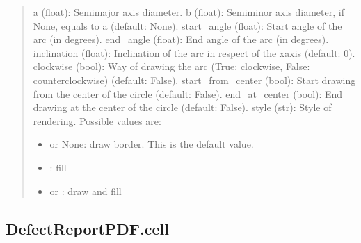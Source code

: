 \documentclass[letterpaper,10pt,english]{sphinxmanual}
\begin{document}
\begin{fulllineitems}
\begin{fulllineitems}
\begin{quote}
\sphinxAtStartPar
a (float): Semi\sphinxhyphen{}major axis diameter.
b (float): Semi\sphinxhyphen{}minor axis diameter, if None, equals to a (default: None).
start\_angle (float): Start angle of the arc (in degrees).
end\_angle (float): End angle of the arc (in degrees).
inclination (float): Inclination of the arc in respect of the x\sphinxhyphen{}axis (default: 0).
clockwise (bool): Way of drawing the arc (True: clockwise, False: counterclockwise) (default: False).
start\_from\_center (bool): Start drawing from the center of the circle (default: False).
end\_at\_center (bool): End drawing at the center of the circle (default: False).
style (str): Style of rendering. Possible values are:
\begin{itemize}
\item {} 
\sphinxAtStartPar
{} or None: draw border. This is the default value.

\item {} 
\sphinxAtStartPar
{}: fill

\item {} 
\sphinxAtStartPar
{} or : draw and fill

\end{itemize}
\end{quote}

\end{fulllineitems}



\subsection{DefectReportPDF.cell}
\label{\detokenize{generated/quality_assessment.quality_pdf_report.DefectReportPDF.cell:defectreportpdf-cell}}\label{\detokenize{generated/quality_assessment.quality_pdf_report.DefectReportPDF.cell::doc}}


\end{fulllineitems}
\end{document}

